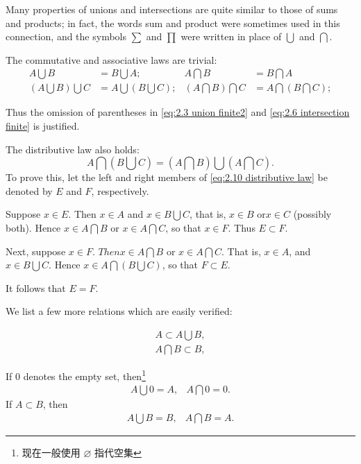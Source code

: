 \begin{myRemark}
    Many properties of unions and intersections are quite similar to those of sums and products; in fact, the words sum and product were sometimes used in this connection, and the symbols $\sum$ and $\prod$ were written in place of $\bigcup$ and $\bigcap$.
\end{myRemark}

The commutative and associative laws are trivial:
\begin{align}
        A \bigcup B &= B \bigcup A; &
        A \bigcap B &= B \bigcap A \label{eq:2.8 commutative} \\
        \left(A \bigcup B\right) \bigcup C &= A \bigcup \left(B \bigcup C\right); &
        \left(A \bigcap B\right) \bigcap C &= A \bigcap \left(B \bigcap C\right);\label{eq:2.9 distributive}
\end{align}

Thus the omission of parentheses in \ref{eq:2.3 union finite2} and \ref{eq:2.6 intersection finite} is justified.

The distributive law also holds:
\begin{equation}\label{eq:2.10 distributive law}
    A \bigcap \left( B \bigcup C\right) = 
    \left(A \bigcap B\right) \bigcup \left(A \bigcap C\right).
\end{equation}
To prove this, let the left and right members of \ref{eq:2.10 distributive law} be denoted by $E$ and $F$, respectively.

Suppose $x \in E$. Then $x \in A$ and $x \in B \bigcup C$, that is, $x \in B$ or$ x \in C$ (possibly both). Hence $x \in A\bigcap B$ or $x \in A\bigcap C$, so that $x \in F$. Thus $E \subset F$.

Next, suppose $x \in F$. $Thenx \in A\bigcap B$ or $x \in A\bigcap C$. That is, $x \in A$, and $x \in B\bigcup C$. Hence $x \in A\bigcap \left(B \bigcup C\right)$, so that $F \subset E$.

It follows that $E = F$.

We list a few more relations which are easily verified:

\begin{align}
    A \subset A \bigcup B, \label{eq:2.11}\\
    A \bigcap B \subset B, \label{eq:2.12}
\end{align}

If $0$ denotes the empty set, then\footnote{现在一般使用 $\varnothing$ 指代空集}
\begin{equation}
    \begin{array}{cc}
        A \bigcup 0 = A, & A \bigcap 0 = 0.
    \end{array}
\end{equation}
If $A \subset B$, then
\begin{equation}
    \begin{array}{cc}
        A \bigcup B = B, & A \bigcap B = A.
    \end{array}
\end{equation}

